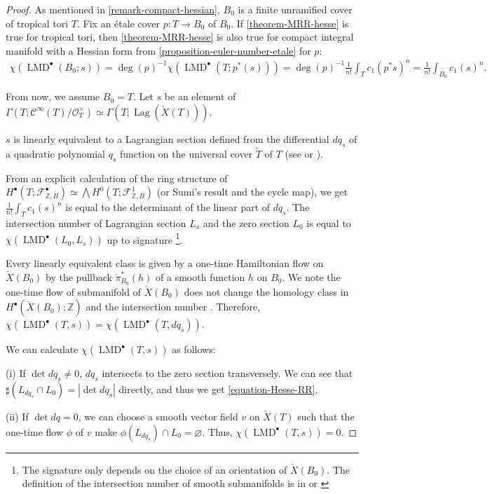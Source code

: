 \documentclass[a4paper,dvipdfmx,reqno,12pt]{amsart}
\theoremstyle{definition}
\newcommand{\emp}{\varnothing}%
\newcommand{\Z}{\mathbb{Z}}%
\newcommand{\mcal}[1]{\mathcal{#1}}%
\newcommand{\opn}[1]{\operatorname{#1}}
\newcommand{\myfootnote}[1]{\hspace{-5pt}\footnote{#1}}
\numberwithin{equation}{section}
\begin{document}
\begin{proof}

As mentioned in \cref{remark-compact-hessian},
$B_0$ is a finite unramified cover of tropical tori $T$.
Fix an \'etale cover $p:T \to B_0$ of $B_0$.
If \cref{theorem-MRR-hesse} is true for tropical tori,
then \cref{theorem-MRR-hesse} is also true for compact
integral manifold with a Hessian form from
\cref{proposition-euler-number-etale} for $p$:
\begin{align}
\chi(\opn{LMD}^{\bullet}(B_0;s))
=\opn{deg}(p)^{-1}\chi(\opn{LMD}^{\bullet}(T;p^{*}(s)))
=\opn{deg}(p)^{-1}\frac{1}{n!}\int_T c_1(p^{*}s)^{n}
=\frac{1}{n!}\int_{B_0}c_1(s)^{n}.
\end{align}

From now, we assume $B_0=T$.
Let $s$ be an element of 
$\Gamma(T;\mcal{C}^{\infty}(T)/\mcal{O}_{T}^{\times})\simeq
\Gamma(T;\opn{Lag}(\check{X}(T)))$.

$s$ is linearly equivalent to a Lagrangian section
defined from the differential $dq_s$ of a quadratic polynomial
$q_s$ function on the universal cover $\tilde{T}$ of $T$
(see \cite{mikhalkinTropicalCurvesTheir2008a} or 
\cite[3.3]{MR4229604}).

From an explicit calculation of the ring structure of
$H^{\bullet}(T;\mathcal{F}_{\mathbb{Z},B}^{\bullet})
\simeq \bigwedge H^{0}(T;\mathcal{F}_{\mathbb{Z},B}^{1})$
(or Sumi's result
\cite[Theorem 47]{MR4229604} and the cycle map), 
we get 
$\frac{1}{n!}\int_{T}c_1(s)^{n}$ is equal to the determinant
of the linear part of $dq_s$. 
The intersection number of Lagrangian
section $L_s$ and the zero section $L_0$ is equal to
$\chi(\opn{LMD}^{\bullet}(L_0,L_s))$ up to 
signature
\myfootnote{The signature only depends on
the choice of 
an orientation of $\check{X}(B_0)$. 
The definition of the intersection number of smooth 
submanifolds is in \cite[5.2]{MR1336822} or 
\cite[0.4]{griffithsPrinciplesAlgebraicGeometry1994a}}. 

Every linearly equivalent 
class is given by a one-time Hamiltonian flow on 
$\check{X}(B_0)$ by the pullback $\check{\pi}_{B_0}^{*}(h)$
of a smooth function $h$ on $B_0$.
We note the one-time flow of submanifold of $\check{X}(B_0)$ does not change
the homology class in $H^{\bullet}(\check{X}(B_0);\Z)$ and
the intersection number \cite[5.2.1. Theorem]{MR1336822}.
Therefore, 
$\chi(\opn{LMD}^{\bullet}(T,s))=
\chi(\opn{LMD}^{\bullet}(T,dq_{s}))$.

We can calculate $\chi(\opn{LMD}^{\bullet}(T,s))$ as follows:

(i) If $\det dq_s\ne 0$, $dq_s$ intersects to 
the zero section transversely. We can see that 
$\sharp(L_{dq_s}\cap L_0)=|\det dq_s|$ directly, and thus
we get \cref{equation-Hesse-RR}. 

(ii) If $\det dq=0$, we can choose a smooth vector field
 $v$ on $\check{X}(T)$ such that the one-time flow 
$\phi$ of $v$ make 
$\phi(L_{dq_s})\cap L_0=\emp$. 
Thus, $\chi(\opn{LMD}^{\bullet}(T,s))=0$.
\end{proof}
\end{document}
